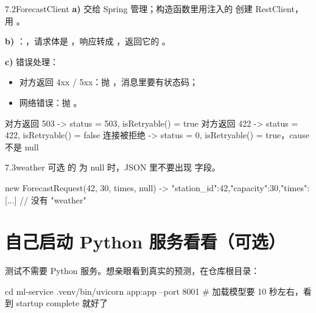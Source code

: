 \begin{task}{7.2\quad ForecastClient}
\textbf{a)} 交给 Spring 管理；构造函数里用注入的  创建 RestClient， 用 。

\textbf{b)} ：，请求体是 ，响应转成 ，返回它的 。

\textbf{c)} 错误处理：
\begin{itemize}
  \item 对方返回 4xx / 5xx：抛 ，消息里要有状态码；
  \item 网络错误：抛 。
\end{itemize}

\begin{example}
\begin{plaincode}
对方返回 503  ->  status = 503, isRetryable() = true
对方返回 422  ->  status = 422, isRetryable() = false
连接被拒绝    ->  status = 0,   isRetryable() = true，cause 不是 null
\end{plaincode}
\end{example}
\end{task}

\begin{task}{7.3\quad weather 可选}
 的  为 null 时，JSON 里不要出现  字段。

\begin{example}
\begin{plaincode}
new ForecastRequest(42, 30, times, null)
  -> {"station_id":42,"capacity":30,"times":[...]}          // 没有 "weather"
\end{plaincode}
\end{example}
\end{task}

\section{自己启动 Python 服务看看（可选）}

测试不需要 Python 服务。想亲眼看到真实的预测，在仓库根目录：

\begin{shell}
cd ml-service
.venv/bin/uvicorn app:app --port 8001          # 加载模型要 10 秒左右，看到 startup complete 就好了
\end{shell}

